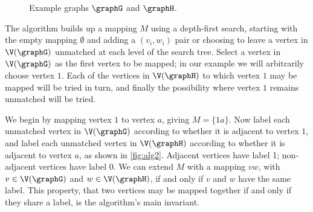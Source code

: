 \begin{figure}[h!]
\centering
    \exampleG
    \qquad
    \exampleH
\caption{Example graphs $\graphG$ and $\graphH$.}
\label{fig:alg1}
\end{figure}

The algorithm builds up a mapping $M$ using a depth-first search, starting with the empty mapping
$\emptyset$ and adding a $(v_i, w_i)$ pair or choosing to leave a vertex in $\V(\graphG)$ unmatched at each level of the search tree.
Select a vertex in $\V(\graphG)$ as the first vertex to be mapped; in our
example we will arbitrarily choose vertex $1$. Each of the vertices in
$\V(\graphH)$ to which vertex $1$ may be mapped will be tried in turn, and
finally the possibility where vertex $1$ remains unmatched will be tried.

We begin by mapping vertex $1$ to vertex $a$, giving $M=\{1a\}$.  Now
label each unmatched vertex in $\V(\graphG)$ according to whether it is adjacent to vertex $1$, and
label each unmatched vertex in $\V(\graphH)$ according to whether it is adjacent to vertex $a$,
as shown in \cref{fig:alg2}.  Adjacent
vertices have label 1; non-adjacent vertices have label 0.  We can extend $M$
with a mapping $vw$, with $v \in \V(\graphG)$ and $w \in \V(\graphH)$, if and only
if $v$ and $w$ have the same label.  This property, that two vertices may be
mapped together if and only if they share a label, is the algorithm's main
invariant.

